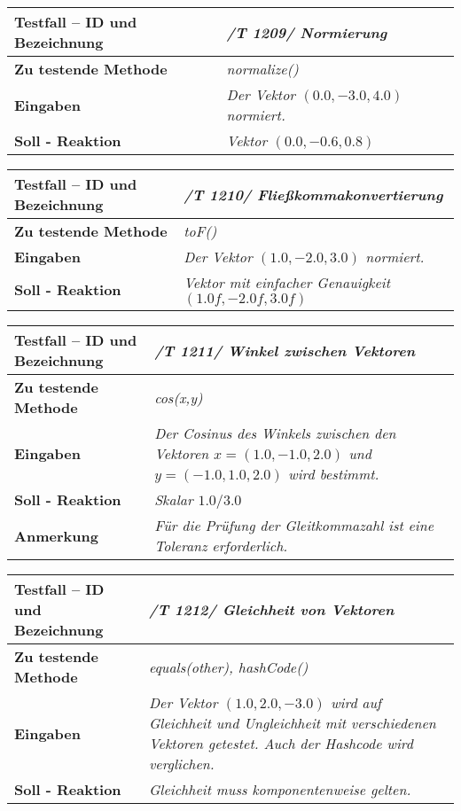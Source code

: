 \begin{longtable}{|p{7cm}|p{10cm}|}
\hline
\textbf{Testfall -- ID und Bezeichnung} & \textit{ /T 1209/ Normierung} \\
\hline
\textbf{Zu testende Methode} &  \textit{normalize()} \\
\hline
\textbf{Eingaben} & \textit{Der Vektor  $(0.0, -3.0, 4.0)$ normiert.}\\
\hline
\textbf{Soll - Reaktion} & \textit{Vektor $(0.0, -0.6, 0.8)$} \\
\hline
\end{longtable}

\begin{longtable}{|p{7cm}|p{10cm}|}
\hline
\textbf{Testfall -- ID und Bezeichnung} & \textit{ /T 1210/ Fließkommakonvertierung} \\
\hline
\textbf{Zu testende Methode} &  \textit{toF()} \\
\hline
\textbf{Eingaben} & \textit{Der Vektor $(1.0,-2.0, 3.0)$ normiert.}\\
\hline
\textbf{Soll - Reaktion} & \textit{Vektor mit einfacher Genauigkeit $(1.0f, -2.0f, 3.0f)$} \\
\hline
\end{longtable}

\begin{longtable}{|p{7cm}|p{10cm}|}
\hline
\textbf{Testfall -- ID und Bezeichnung} & \textit{ /T 1211/ Winkel zwischen Vektoren} \\
\hline
\textbf{Zu testende Methode} &  \textit{cos(x,y)} \\
\hline
\textbf{Eingaben} & \textit{Der Cosinus des Winkels zwischen den Vektoren 
$x=(1.0, -1.0, 2.0)$ und $y=(-1.0, 1.0, 2.0)$ wird bestimmt.}\\
\hline
\textbf{Soll - Reaktion} & \textit{Skalar $1.0/3.0$} \\
\hline
\textbf{Anmerkung} & \textit{Für die Prüfung der Gleitkommazahl ist eine 
Toleranz erforderlich.} \\
\hline
\end{longtable}
\begin{longtable}{|p{7cm}|p{10cm}|}
\hline
\textbf{Testfall -- ID und Bezeichnung} & \textit{ /T 1212/ Gleichheit von Vektoren} \\
\hline
\textbf{Zu testende Methode} &  \textit{equals(other), hashCode()} \\
\hline
\textbf{Eingaben} & \textit{Der Vektor $(1.0, 2.0, -3.0)$ wird auf Gleichheit und
Ungleichheit mit verschiedenen Vektoren getestet. Auch der Hashcode wird verglichen.}\\
\hline
\textbf{Soll - Reaktion} & \textit{Gleichheit muss komponentenweise gelten.} \\
\hline
\end{longtable}

